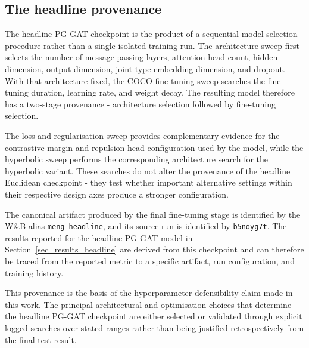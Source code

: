 \subsection{The headline provenance}
\label{sec_meth_evaluation_provenance}

The headline PG-GAT checkpoint is the product of a sequential
model-selection procedure
rather than a single isolated training run.
The architecture sweep first selects the number of message-passing
layers,
attention-head count,
hidden dimension,
output dimension,
joint-type embedding dimension,
and dropout.
With that architecture fixed,
the COCO fine-tuning sweep searches the fine-tuning duration,
learning rate,
and weight decay.
The resulting model therefore has a two-stage provenance -
architecture selection followed by fine-tuning selection.

The loss-and-regularisation sweep provides complementary evidence
for the contrastive margin and repulsion-head configuration
used by the model,
while the hyperbolic sweep performs the corresponding architecture
search for the hyperbolic variant.
These searches do not alter the provenance
of the headline Euclidean checkpoint -
they test whether important alternative settings within their respective
design axes produce a stronger configuration.

The canonical artifact produced by the final fine-tuning stage is
identified by the W\&B alias \texttt{meng-headline},
and its source run is identified by \texttt{b5noyg7t}.
The results reported for the headline PG-GAT model in
Section~\ref{sec_results_headline} are derived from this checkpoint
and can therefore be traced from the reported metric to a specific
artifact,
run configuration,
and training history.

This provenance is the basis of the hyperparameter-defensibility claim
made in this work.
The principal architectural and optimisation choices that determine
the headline PG-GAT checkpoint are either selected or validated
through explicit logged searches over stated ranges
rather than being justified retrospectively from the final test result.